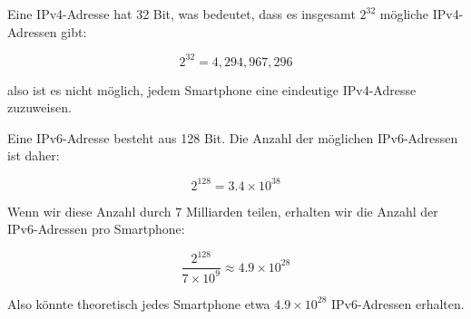 \documentclass[a4paper]{scrartcl}
\begin{document}
Eine IPv4-Adresse hat 32 Bit, was bedeutet, dass es insgesamt $2^{32}$ mögliche IPv4-Adressen gibt:

\[
2^{32} = 4,294,967,296
\]

also ist es nicht möglich, jedem Smartphone eine eindeutige IPv4-Adresse zuzuweisen.

Eine IPv6-Adresse besteht aus 128 Bit. Die Anzahl der möglichen IPv6-Adressen ist daher:

\[
2^{128} = 3.4 \times 10^{38}
\]

Wenn wir diese Anzahl durch 7 Milliarden teilen, erhalten wir die Anzahl der IPv6-Adressen pro Smartphone:

\[
\frac{2^{128}}{7 \times 10^9} \approx 4.9 \times 10^{28}
\]

Also könnte theoretisch jedes Smartphone etwa $4.9 \times 10^{28}$ IPv6-Adressen erhalten.
\end{document}
